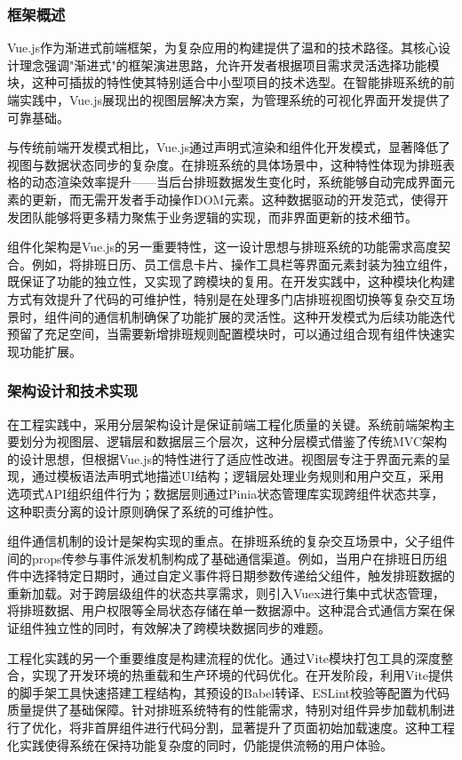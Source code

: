 \documentclass{ctexart}
\begin{document}
\subsubsection{框架概述}

Vue.js作为渐进式前端框架，为复杂应用的构建提供了温和的技术路径。其核心设计理念强调"渐进式"的框架演进思路，允许开发者根据项目需求灵活选择功能模块，这种可插拔的特性使其特别适合中小型项目的技术选型。在智能排班系统的前端实践中，Vue.js展现出的视图层解决方案，为管理系统的可视化界面开发提供了可靠基础。

与传统前端开发模式相比，Vue.js通过声明式渲染和组件化开发模式，显著降低了视图与数据状态同步的复杂度。在排班系统的具体场景中，这种特性体现为排班表格的动态渲染效率提升——当后台排班数据发生变化时，系统能够自动完成界面元素的更新，而无需开发者手动操作DOM元素。这种数据驱动的开发范式，使得开发团队能够将更多精力聚焦于业务逻辑的实现，而非界面更新的技术细节。

组件化架构是Vue.js的另一重要特性，这一设计思想与排班系统的功能需求高度契合。例如，将排班日历、员工信息卡片、操作工具栏等界面元素封装为独立组件，既保证了功能的独立性，又实现了跨模块的复用。在开发实践中，这种模块化构建方式有效提升了代码的可维护性，特别是在处理多门店排班视图切换等复杂交互场景时，组件间的通信机制确保了功能扩展的灵活性。这种开发模式为后续功能迭代预留了充足空间，当需要新增排班规则配置模块时，可以通过组合现有组件快速实现功能扩展。

\subsubsection{架构设计和技术实现}

在工程实践中，采用分层架构设计是保证前端工程化质量的关键。系统前端架构主要划分为视图层、逻辑层和数据层三个层次，这种分层模式借鉴了传统MVC架构的设计思想，但根据Vue.js的特性进行了适应性改进。视图层专注于界面元素的呈现，通过模板语法声明式地描述UI结构；逻辑层处理业务规则和用户交互，采用选项式API组织组件行为；数据层则通过Pinia状态管理库实现跨组件状态共享，这种职责分离的设计原则确保了系统的可维护性。

组件通信机制的设计是架构实现的重点。在排班系统的复杂交互场景中，父子组件间的props传参与事件派发机制构成了基础通信渠道。例如，当用户在排班日历组件中选择特定日期时，通过自定义事件将日期参数传递给父组件，触发排班数据的重新加载。对于跨层级组件的状态共享需求，则引入Vuex进行集中式状态管理，将排班数据、用户权限等全局状态存储在单一数据源中。这种混合式通信方案在保证组件独立性的同时，有效解决了跨模块数据同步的难题。

工程化实践的另一个重要维度是构建流程的优化。通过Vite模块打包工具的深度整合，实现了开发环境的热重载和生产环境的代码优化。在开发阶段，利用Vite提供的脚手架工具快速搭建工程结构，其预设的Babel转译、ESLint校验等配置为代码质量提供了基础保障。针对排班系统特有的性能需求，特别对组件异步加载机制进行了优化，将非首屏组件进行代码分割，显著提升了页面初始加载速度。这种工程化实践使得系统在保持功能复杂度的同时，仍能提供流畅的用户体验。
\end{document}
